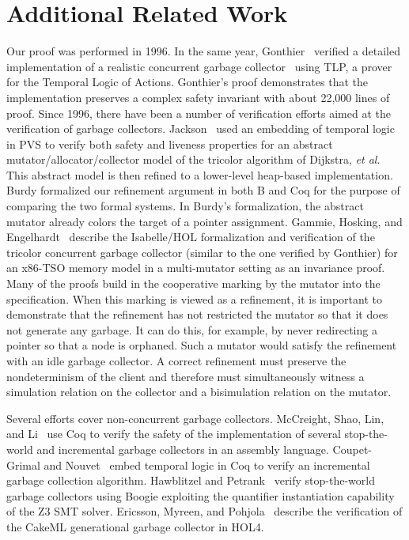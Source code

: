 
\section{Additional Related Work}
\label{sec:related-work}

Our proof was performed in 1996.  In the same year, 
Gonthier~\cite{gonthier1996verifying}
verified a detailed 
implementation of a realistic concurrent garbage collector~\cite{doligez1994portable} using TLP, a prover
for the Temporal Logic of Actions.  Gonthier's proof demonstrates 
that the implementation preserves a complex safety invariant 
with about 22,000 lines of proof.  Since 1996, there have been a
number of
verification efforts aimed at the verification of garbage collectors.
Jackson~\cite{jackson1998verifying} used an embedding of temporal logic in PVS to verify both
safety and liveness properties for an abstract
mutator/allocator/collector model of the tricolor algorithm of
Dijkstra, \emph{et al}.  This abstract model is then
refined to a lower-level heap-based implementation.  Burdy formalized
our refinement argument in both B and Coq for the purpose of comparing
the
two formal systems.  In Burdy's formalization, the abstract mutator
already colors the target of a pointer assignment.
Gammie, Hosking,
and Engelhardt~\cite{gammie2015relaxing} describe the Isabelle/HOL
formalization and verification of
the tricolor concurrent garbage 
collector (similar to the one verified by Gonthier) for an x86-TSO
memory model in a multi-mutator setting as an invariance proof.
Many of the proofs build in the cooperative marking by the mutator
into the specification.  When this marking is viewed as a refinement,
it
is important to demonstrate that the refinement has not restricted the
mutator so that it does not generate any garbage.  It can do this, for
example,
by never redirecting a pointer so that a node is orphaned.  Such a
mutator
would satisfy the refinement with an idle garbage collector.  A
correct
refinement must preserve the nondeterminism of the client and
therefore must simultaneously witness a simulation relation on the
collector and a bisimulation
relation on the mutator.  

Several efforts cover non-concurrent garbage collectors.  McCreight,
Shao, Lin, and Li~\cite{mccreight2007general} use Coq to
verify the safety of the implementation of several
stop-the-world and incremental garbage collectors in an assembly
language.  Coupet-Grimal and Nouvet~\cite{8133460} embed temporal
logic in Coq to verify an incremental garbage collection algorithm.
Hawblitzel and Petrank~\cite{hawblitzel2009automated} verify stop-the-world garbage collectors using
Boogie exploiting the quantifier instantiation capability of the Z3
SMT solver. Ericsson, Myreen, and Pohjola~\cite{ericsson2017verified}
describe the verification of
the CakeML generational garbage collector in HOL4.


